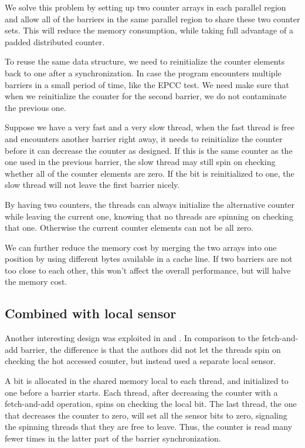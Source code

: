 We solve this problem by setting up two counter arrays in each
parallel region and allow all of the barriers in the same parallel region
to share these two counter sets.  This will reduce the memory consumption,
while taking full advantage of a padded distributed counter.

To reuse the same data structure,
we need to reinitialize the counter elements back to one after a
synchronization.
In case the program encounters
multiple barriers in a small period of time, like the EPCC test. We
need make sure that when we reinitialize the counter for the second
barrier, we do not contaminate the previous one.

Suppose we have a very fast and a very slow thread,
when the fast thread is free and encounters
another barrier right away, it needs to reinitialize the counter
before it can decrease the counter as designed. If this is the same
counter as the one used in the previous barrier, the slow thread may
still spin on checking whether all of the counter elements are zero. If
the bit is reinitialized to one, the slow thread will not leave the
first barrier nicely.

By having two counters, the threads can always initialize the alternative
counter while leaving the current one, knowing that no threads are
spinning on checking that one. Otherwise the current counter elements
can not be all zero.

We can further reduce the memory cost by merging the two arrays into
one position by using different bytes available in a cache line. If 
two barriers are not too close to each other, this won't affect the 
overall performance, but will halve the memory cost.

\subsection{Combined with local sensor}
\label{sec:combined}

Another interesting design was exploited in \cite{Mel91} and
\cite{Nik99}. In comparison to the fetch-and-add barrier, the
difference is that the authors did not let the threads spin on
checking the hot accessed counter, but instead used a separate local sensor.

A bit is allocated in the shared memory local to each thread, and
initialized to one before a barrier starts. Each thread, after
decreasing the counter with a fetch-and-add operation, spins on
checking the local bit. The last thread, the one that decreases the counter
to zero, will set all the sensor bits to zero, signaling the spinning threads
that they are free to leave. Thus, the counter is read many fewer times in the latter
part of the barrier synchronization.

